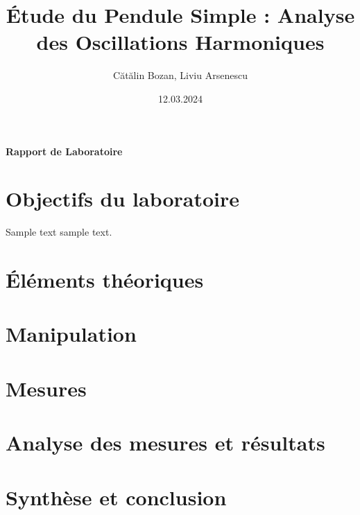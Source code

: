\documentclass[30pt, a4paper]{article}
\title{Étude du Pendule Simple : Analyse des Oscillations Harmoniques}
\author{Cătălin Bozan, Liviu Arsenescu}
\date{12.03.2024}
\begin{document}
    \maketitle
    \begin{center}
        \textbf{Rapport de Laboratoire}
    \end{center}
    \newpage
    \tableofcontents
    \newpage

    \section{Objectifs du laboratoire}
    Sample text sample text.
    \newpage

    \section{Éléments théoriques}
    \newpage

    \section{Manipulation}
    \newpage

    \section{Mesures}
    \newpage

    \section{Analyse des mesures et résultats}
    \newpage

    \section{Synthèse et conclusion}
\end{document}
